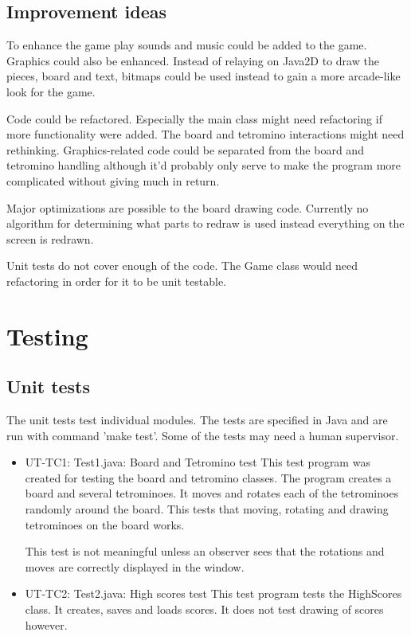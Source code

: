 \documentclass[11pt,a4paper]{article}
\begin{document}
\subsection {Improvement ideas}

To enhance the game play sounds and music could be added to the game.
Graphics could also be enhanced. Instead of relaying on Java2D to draw
the pieces, board and text, bitmaps could be used instead to gain a
more arcade-like look for the game.

Code could be refactored. Especially the main class might need
refactoring if more functionality were added. The board and tetromino
interactions might need rethinking. Graphics-related code could be separated
from the board and tetromino handling although it'd probably only serve to make the
program more complicated without giving much in return.

Major optimizations are possible to the board drawing code. Currently
no algorithm for determining what parts to redraw is used instead everything
on the screen is redrawn.

Unit tests do not cover enough of the code. The Game class would need
refactoring in order for it to be unit testable.

\section {Testing}

\subsection {Unit tests}

The unit tests test individual modules. The tests are specified in Java and are run
with command 'make test'. Some of the tests may need a human supervisor.

\begin{itemize}
\item UT-TC1: Test1.java: Board and Tetromino test
  This test program was created for testing the board and tetromino
  classes. The program creates a board and several tetrominoes.
  It moves and rotates each of the tetrominoes randomly around the
  board. This tests that moving, rotating and drawing
  tetrominoes on the board works.

  This test is not meaningful unless an observer sees that the rotations and moves
  are correctly displayed in the window.

\item UT-TC2: Test2.java: High scores test
  This test program tests the HighScores class. It creates, saves
  and loads scores. It does not test drawing of scores however.
\end{itemize}
\end{document}
